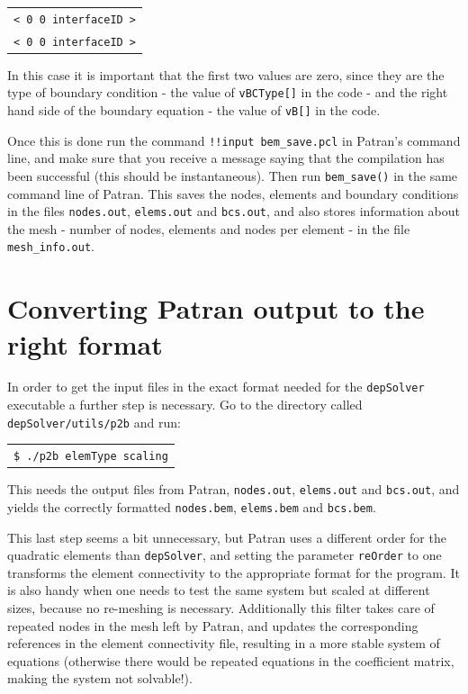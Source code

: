\documentclass[12pt]{report}
\begin{document}
\begin{tabular}{l}
\texttt{< 0 0 interfaceID >}\\
\texttt{< 0 0 interfaceID >}
\end{tabular}

In this case it is important that the first two values are zero, since they are the type of boundary condition - the value of \verb+vBCType[]+ in the code - and the right hand side of the boundary equation - the value of \verb+vB[]+ in the code.

Once this is done run the command \verb+!!input bem_save.pcl+ in Patran's command line, and make sure that you receive a message saying that the compilation has been successful (this should be instantaneous). Then run \verb+bem_save()+ in the same command line of Patran. This saves the nodes, elements and boundary conditions in the files \verb+nodes.out+, \verb+elems.out+ and \verb+bcs.out+, and also stores information about the mesh - number of nodes, elements and nodes per element - in the file \verb+mesh_info.out+.

\section{Converting Patran output to the right format}
In order to get the input files in the exact format needed for the \verb+depSolver+ executable a further step is necessary. Go to the directory called \verb+depSolver/utils/p2b+ and run:

\begin{tabular}{l}
\texttt{\$ ./p2b elemType scaling}
\end{tabular}

This needs the output files from Patran, \verb+nodes.out+, \verb+elems.out+ and \verb+bcs.out+, and yields the correctly formatted \verb+nodes.bem+, \verb+elems.bem+ and \verb+bcs.bem+.

This last step seems a bit unnecessary, but Patran uses a different order for the quadratic elements than \verb+depSolver+, and setting the parameter \verb+reOrder+ to one transforms the element connectivity to the appropriate format for the program. It is  also handy when one needs to test the same system but scaled at different sizes, because no re-meshing is necessary. Additionally this filter takes care of repeated nodes in the mesh left by Patran, and updates the corresponding references in the element connectivity file, resulting in a more stable system of equations (otherwise there would be repeated equations in the coefficient matrix, making the system not solvable!).
\end{document}
